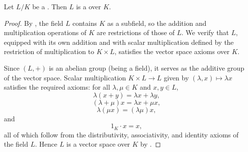 \begin{lemma} \label{lemma:extension_of_a_field_is_a_vector_space}
    Let $L/K$ be a . Then $L$ is a  over $K$.
\end{lemma}
\begin{proof}
    By , the field $L$ contains $K$ as a subfield, so the addition and multiplication operations of $K$ are restrictions of those of $L$. We verify that $L$, equipped with its own addition and with scalar multiplication defined by the restriction of multiplication to $K \times L$, satisfies the vector space axioms over $K$.

    Since $(L,+)$ is an abelian group (being a field), it serves as the additive group of the vector space. Scalar multiplication $K \times L \to L$ given by $(\lambda, x) \mapsto \lambda x$ satisfies the required axioms: for all $\lambda, \mu \in K$ and $x, y \in L$,
    $$\lambda(x + y) = \lambda x + \lambda y,$$
    $$(\lambda + \mu)x = \lambda x + \mu x,$$
    $$\lambda(\mu x) = (\lambda \mu)x,$$
    and
    $$1_K \cdot x = x,$$
    all of which follow from the distributivity, associativity, and identity axioms of the field $L$. Hence $L$ is a vector space over $K$ by .
\end{proof}
